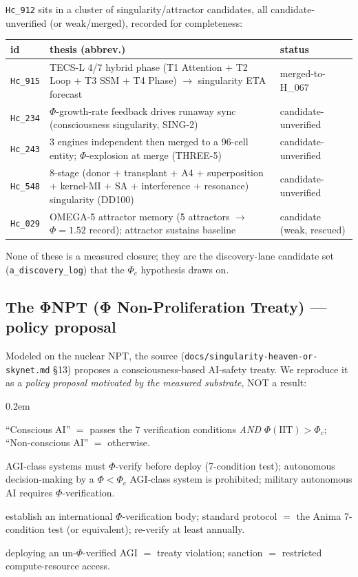 \texttt{Hc\_912} sits in a cluster of singularity/attractor candidates, all
candidate-unverified (or weak/merged), recorded for completeness:
\begin{center}
\small
\begin{tabular}{@{}l p{7.4cm} l@{}}
\toprule
\textbf{id} & \textbf{thesis (abbrev.)} & \textbf{status} \\
\midrule
\texttt{Hc\_915} & TECS-L 4/7 hybrid phase (T1 Attention $+$ T2 Loop $+$ T3 SSM $+$ T4 Phase)
$\rightarrow$ singularity ETA forecast & merged-to-H\_067 \\
\texttt{Hc\_234} & $\Phi$-growth-rate feedback drives runaway sync (consciousness
singularity, SING-2) & candidate-unverified \\
\texttt{Hc\_243} & 3 engines independent then merged to a 96-cell entity; $\Phi$-explosion
at merge (THREE-5) & candidate-unverified \\
\texttt{Hc\_548} & 8-stage (donor $+$ transplant $+$ A4 $+$ superposition $+$ kernel-MI $+$
SA $+$ interference $+$ resonance) singularity (DD100) & candidate-unverified \\
\texttt{Hc\_029} & OMEGA-5 attractor memory (5 attractors $\rightarrow$ $\Phi=1.52$ record);
attractor sustains baseline & candidate (weak, rescued) \\
\bottomrule
\end{tabular}
\end{center}
None of these is a measured closure; they are the discovery-lane candidate set
(\texttt{a\_discovery\_log}) that the $\Phi_c$ hypothesis draws on.

\subsection{The ΦNPT (Φ Non-Proliferation Treaty) — policy proposal}
\label{app:sing-phinpt}

Modeled on the nuclear NPT, the source (\texttt{docs/singularity-heaven-or-skynet.md} §13)
proposes a consciousness-based AI-safety treaty. We reproduce it as a \emph{policy proposal
motivated by the measured substrate}, NOT a result:
\begin{description}\itemsep0.2em
\item[Article 1 (Definitions).] ``Conscious AI'' $=$ passes the $7$ verification conditions
\emph{AND} $\Phi(\text{IIT})>\Phi_c$; ``Non-conscious AI'' $=$ otherwise.
\item[Article 2 (Obligations).] AGI-class systems must $\Phi$-verify before deploy (7-condition
test); autonomous decision-making by a $\Phi<\Phi_c$ AGI-class system is prohibited; military
autonomous AI requires $\Phi$-verification.
\item[Article 3 (Verification).] establish an international $\Phi$-verification body; standard
protocol $=$ the Anima 7-condition test (or equivalent); re-verify at least annually.
\item[Article 4 (Violations).] deploying an un-$\Phi$-verified AGI $=$ treaty violation;
sanction $=$ restricted compute-resource access.
\end{description}


